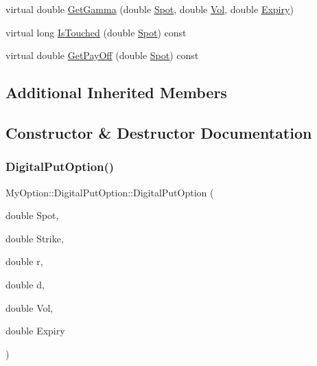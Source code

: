 \begin{DoxyCompactItemize}
\item 
virtual double \hyperlink{classMyOption_1_1DigitalPutOption_a4eeb4d0c53f0075ee80e67270f4bd6a5}{Get\+Gamma} (double \hyperlink{classMyOption_1_1Option_a6c6f01d75cde7e92d16a6d8d6f331a1d}{Spot}, double \hyperlink{classMyOption_1_1Option_a5d6002c14b335c782873bf1437113513}{Vol}, double \hyperlink{classMyOption_1_1Option_ac1adacb417fede41d151b9cda05bcb3d}{Expiry})
\item 
virtual long \hyperlink{classMyOption_1_1DigitalPutOption_a6e38fdd2a8d6f6f959e5cdb0a66e4057}{Is\+Touched} (double \hyperlink{classMyOption_1_1Option_a6c6f01d75cde7e92d16a6d8d6f331a1d}{Spot}) const
\item 
virtual double \hyperlink{classMyOption_1_1DigitalPutOption_abadcbb78c02b4e6ee22d45da1c72f7b1}{Get\+Pay\+Off} (double \hyperlink{classMyOption_1_1Option_a6c6f01d75cde7e92d16a6d8d6f331a1d}{Spot}) const
\end{DoxyCompactItemize}
\subsection*{Additional Inherited Members}


\subsection{Constructor \& Destructor Documentation}
\hypertarget{classMyOption_1_1DigitalPutOption_a06d1c6c093b1bf2a1fcc24e46be8f06f}{}\label{classMyOption_1_1DigitalPutOption_a06d1c6c093b1bf2a1fcc24e46be8f06f} 
\subsubsection{\texorpdfstring{Digital\+Put\+Option()}{DigitalPutOption()}}
{\footnotesize\ttfamily My\+Option\+::\+Digital\+Put\+Option\+::\+Digital\+Put\+Option (\begin{DoxyParamCaption}\item[{double}]{Spot,  }\item[{double}]{Strike,  }\item[{double}]{r,  }\item[{double}]{d,  }\item[{double}]{Vol,  }\item[{double}]{Expiry }\end{DoxyParamCaption})}

